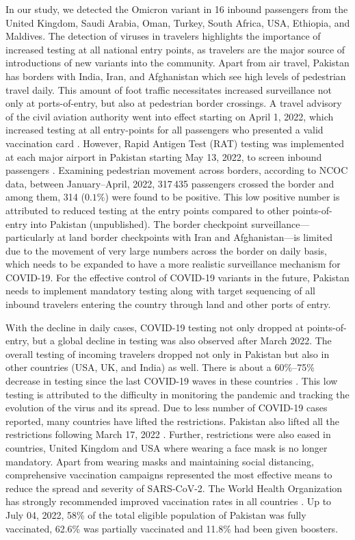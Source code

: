In our study, we detected the Omicron variant in 16 inbound passengers from the United Kingdom, Saudi Arabia, Oman, Turkey, South Africa, USA, Ethiopia, and Maldives.
The detection of viruses in travelers highlights the importance of increased testing at all national entry points, as travelers are the major source of introductions of new variants into the community.
Apart from air travel, Pakistan has borders with India, Iran, and Afghanistan which see high levels of pedestrian travel daily.
This amount of foot traffic necessitates increased surveillance not only at ports-of-entry, but also at pedestrian border crossings.
A travel advisory of the civil aviation authority went into effect starting on April 1, 2022, which increased testing at all entry-points for all passengers who presented a valid vaccination card \citep{caapakistan-covid-guidelines}.
However, Rapid Antigen Test (RAT) testing was implemented at each major airport in Pakistan starting May 13, 2022, to screen inbound passengers \citep{brecorder-inbound-flights}.
Examining pedestrian movement across borders, according to NCOC data, between January--April, 2022, 317\,435 passengers crossed the border and among them, 314 ($0.1\%$) were found to be positive.
This low positive number is attributed to reduced testing at the entry points compared to other points-of-entry into Pakistan (unpublished).
The border checkpoint surveillance---particularly at land border checkpoints with Iran and Afghanistan---is limited due to the movement of very large numbers across the border on daily basis, which needs to be expanded to have a more realistic surveillance mechanism for COVID-19.
For the effective control of COVID-19 variants in the future, Pakistan needs to implement mandatory testing along with target sequencing of all inbound travelers entering the country through land and other ports of entry.

With the decline in daily cases, COVID-19 testing not only dropped at points-of-entry, but a global decline in testing was also observed after March 2022.
The overall testing of incoming travelers dropped not only in Pakistan but also in other countries (USA, UK, and India) as well.
There is about a 60\%--75\% decrease in testing since the last COVID-19 waves in these countries \citep{ourworldindata-covid-explorer}.
This low testing is attributed to the difficulty in monitoring the pandemic and tracking the evolution of the virus and its spread.
Due to less number of COVID-19 cases reported, many countries have lifted the restrictions.
Pakistan also lifted all the restrictions following March 17, 2022 \citep{business-standard-covid-curbs}.
Further, restrictions were also eased in countries, United Kingdom \citep{bbc-health-news} and USA \citep{cdc-mask-travel-guidance} where wearing a face mask is no longer mandatory.
Apart from wearing masks and maintaining social distancing, comprehensive vaccination campaigns represented the most effective means to reduce the spread and severity of SARS-CoV-2.
The World Health Organization has strongly recommended improved vaccination rates in all countries \citep{who-covid19-vaccine-advice}.
Up to July 04, 2022, 58\% of the total eligible population of Pakistan was fully vaccinated, 62.6\% was partially vaccinated and 11.8\% had been given boosters.

